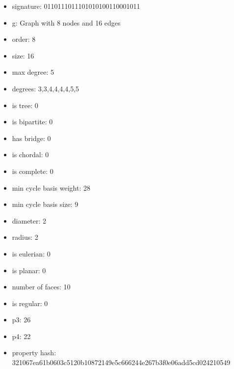 \begin{itemize}
\item signature: 0110111011101010100110001011
\item g: Graph with 8 nodes and 16 edges
\item order: 8
\item size: 16
\item max degree: 5
\item degrees: 3,3,4,4,4,4,5,5
\item is tree: 0
\item is bipartite: 0
\item has bridge: 0
\item is chordal: 0
\item is complete: 0
\item min cycle basis weight: 28
\item min cycle basis size: 9
\item diameter: 2
\item radius: 2
\item is eulerian: 0
\item is planar: 0
\item number of faces: 10
\item is regular: 0
\item p3: 26
\item p4: 22
\item property hash: 321067ea61b0603c5120b10872149e5c666244e267b3f0e06add5cd024210549
\end{itemize}
\newpage
\begin{figure}
\end{figure}
